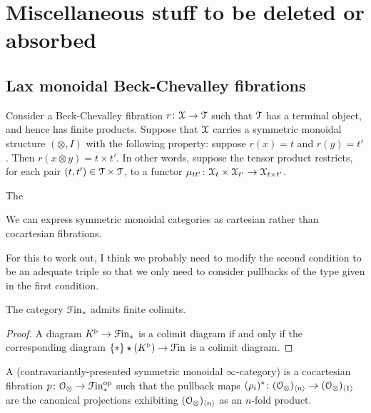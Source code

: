 \documentclass[main.tex]{subfiles}
\begin{document}
\section{Miscellaneous stuff to be deleted or absorbed}
\label{sec:miscellaneous_stuff_to_be_deleted_or_absorbed}

\subsection{Lax monoidal Beck-Chevalley fibrations}
\label{ssc:lax_monoidal_beck_chevalley_fibrations}

Consider a Beck-Chevalley fibration $r\colon \mathcal{X} \to \mathcal{T}$ such that $\mathcal{T}$ has a terminal object, and hence has finite products. Suppose that $\mathcal{X}$ carries a symmetric monoidal structure $(\otimes, I)$ with the following property: suppose $r(x) = t$ and $r(y) = t'$. Then $r(x \otimes y) = t \times t'$. In other words, suppose the tensor product restricts, for each pair $(t, t') \in \mathcal{T} \times \mathcal{T}$, to a functor $\mu_{tt'}\colon \mathcal{X}_{t} \times \mathcal{X}_{t'} \to \mathcal{X}_{t \times t'}$.

The 

We can express symmetric monoidal categories as cartesian rather than cocartesian fibrations.

\begin{note}
  For this to work out, I think we probably need to modify the second condition to be an adequate triple so that we only need to consider pullbacks of the type given in the first condition.
\end{note}

\begin{lemma}
  The category $\mathcal{F}\mathrm{in}_{*}$ admits finite colimits.
\end{lemma}
\begin{proof}
  A diagram $K^{\triangleright} \to \mathcal{F}\mathrm{in}_{*}$ is a colimit diagram if and only if the corresponding diagram $\{\ast\} \star (K^{\triangleright}) \to \mathcal{F}\mathrm{in}$ is a colimit diagram.
\end{proof}

\begin{definition}
  A  (contravariantly-presented symmetric monoidal $\infty$-category) is a cocartesian fibration $p\colon \mathcal{O}_{\otimes} \to \mathcal{F}\mathrm{in}_{*}^{\mathrm{op}}$ such that the pullback maps $(\rho_{i})^{*}\colon (\mathcal{O}_{ \otimes})_{\langle n \rangle} \to (\mathcal{O}_{ \otimes})_{\langle 1 \rangle}$ are the canonical projections exhibiting $(\mathcal{O}_{ \otimes})_{\langle n \rangle}$ as an $n$-fold product.
\end{definition}
\end{document}
